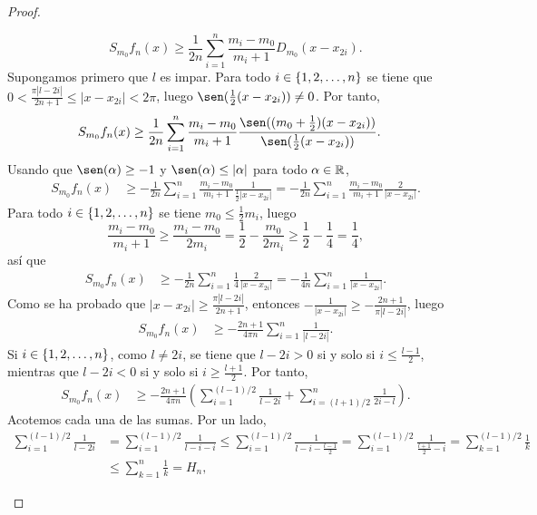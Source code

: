 \documentclass[a4paper, 12pt]{book}
\begin{document}
\begin{proof}
\begin{itemize}
        \[S_{m_0}f_n(x) \geq \frac{1}{2n}\sum_{i=1}^n \frac{m_i - m_0}{m_i + 1}D_{m_0}(x-x_{2i}).\]
        Supongamos primero que $l$ es impar. Para todo $i \in \{1,2,\mathellipsis,n\}$ se tiene que $0 < \frac{\pi |l-2i|}{2n+1} \leq |x-x_{2i}|< 2\pi $, luego $\sen(\frac{1}{2}(x-x_{2i})) \neq 0$. Por tanto,
        \begin{align*}
            S_{m_0}f_n(x) &\geq \frac{1}{2n}\sum_{i=1}^n \frac{m_i-m_0}{m_i+1}\frac{\sen((m_0+\frac{1}{2})(x-x_{2i}))}{\sen(\frac{1}{2}(x-x_{2i}))}.
        \end{align*}
        Usando que $\sen(\alpha) \geq -1$ y $\sen(\alpha)\leq |\alpha|$ para todo $\alpha \in \mathbb R$,
        \begin{align*}
            S_{m_0}f_n(x) &\geq -\frac{1}{2n}\sum_{i=1}^n \frac{m_i-m_0}{m_i+1}\frac{1}{\frac{1}{2}|x-x_{2i}|} = -\frac{1}{2n}\sum_{i=1}^n \frac{m_i-m_0}{m_i+1}\frac{2}{|x-x_{2i}|} .
        \end{align*}
        Para todo $i \in \{1,2,\mathellipsis,n\}$ se tiene $m_0 \leq \frac{1}{2}m_i$, luego \[\frac{m_i-m_0}{m_i+1} \geq \frac{m_i-m_0}{2m_i} = \frac{1}{2}-\frac{m_0}{2m_i} \geq \frac{1}{2}-\frac{1}{4} = \frac{1}{4},\]
        así que
        \begin{align*}
            S_{m_0}f_n(x) &\geq -\frac{1}{2n}\sum_{i=1}^n \frac{1}{4}\frac{2}{|x-x_{2i}|} = -\frac{1}{4n}\sum_{i=1}^n \frac{1}{|x-x_{2i}|}.
        \end{align*}
        Como se ha probado que $|x-x_{2i}| \geq \frac{\pi |l -2i|}{2n+1}$, entonces $-\frac{1}{|x-x_{2i}|} \geq -\frac{2n+1}{\pi|l-2i|}$, luego
        \begin{align*}
            S_{m_0}f_n(x) &\geq -\frac{2n+1}{4\pi n}\sum_{i=1}^n \frac{1}{|l-2i|}.
        \end{align*}
        Si $i \in \{1,2,\mathellipsis,n\}$, como $l \neq 2i$, se tiene que $l - 2i > 0$ si y solo si $i \leq \frac{l-1}{2}$, mientras que $l - 2i < 0$ si y solo si $i \geq \frac{l+1}{2}$. Por tanto,
        \begin{align*}
            S_{m_0}f_n(x) &\geq -\frac{2n+1}{4\pi n}\left(\sum_{i=1}^{(l-1)/2} \frac{1}{l-2i} +\sum_{i=(l+1)/2}^n \frac{1}{2i-l}\right).
        \end{align*}
        Acotemos cada una de las sumas. Por un lado,
        \begin{align*}
            \sum_{i=1}^{(l-1)/2}\frac{1}{l-2i} &= \sum_{i=1}^{(l-1)/2} \frac{1}{l-i-i} \leq \sum_{i=1}^{(l-1)/2} \frac{1}{l-i-\frac{l-1}{2}} = \sum_{i=1}^{(l-1)/2} \frac{1}{\frac{l+1}{2}-i} = \sum_{k=1}^{(l-1)/2} \frac{1}{k} \\ &\leq \sum_{k=1}^{n}\frac{1}{k} = H_n,

\end{align*}
\end{itemize}
\end{proof}
\end{document}
